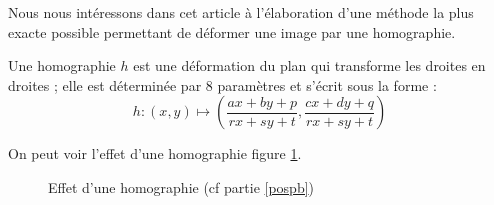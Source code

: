 


\label{pospb}
	Nous nous intéressons dans cet article à l'élaboration d'une méthode la plus exacte possible permettant de déformer une image par une homographie.
	
	\begin{Def}
 	Une homographie $h$ est une déformation du plan qui transforme les droites en droites ; elle est déterminée par 8 paramètres et s'écrit sous la forme :
	\[h : (x,y)\mapsto\left( \frac{ax+by+p}{rx+sy+t},\frac{cx+dy+q}{rx+sy+t}\right)\]
	\label{definition_homographie}
	\end{Def}
On peut voir l'effet d'une homographie figure \ref{effethom}.\\

 \begin{figure}
 
   \centering
    \arrowPDP 
   \caption{Effet d'une homographie (cf partie \ref{pospb})}
\label{effethom}
 \end{figure}


